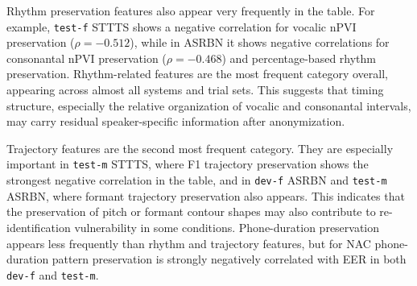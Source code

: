 \documentclass[12pt,leqno,a4paper]{article}
\begin{document}
Rhythm preservation features also appear very frequently in the table. For example, \texttt{test-f} STTTS shows a negative correlation for vocalic nPVI preservation ($\rho=-0.512$), while in ASRBN it shows negative correlations for consonantal nPVI preservation ($\rho=-0.468$) and percentage-based rhythm preservation. Rhythm-related features are the most frequent category overall, appearing across almost all systems and trial sets. This suggests that timing structure, especially the relative organization of vocalic and consonantal intervals, may carry residual speaker-specific information after anonymization.

Trajectory features are the second most frequent category. They are especially important in \texttt{test-m} STTTS, where F1 trajectory preservation shows the strongest negative correlation in the table, and in \texttt{dev-f} ASRBN and \texttt{test-m} ASRBN, where formant trajectory preservation also appears. This indicates that the preservation of pitch or formant contour shapes may also contribute to re-identification vulnerability in some conditions. Phone-duration preservation appears less frequently than rhythm and trajectory features, but for NAC phone-duration pattern preservation is strongly negatively correlated with EER in both \texttt{dev-f} and \texttt{test-m}.
\end{document}
